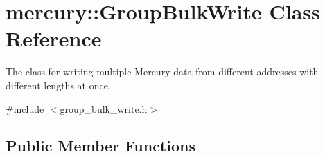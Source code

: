 \hypertarget{classmercury_1_1_group_bulk_write}{}\section{mercury\+:\+:Group\+Bulk\+Write Class Reference}
\label{classmercury_1_1_group_bulk_write}


The class for writing multiple Mercury data from different addresses with different lengths at once.  




{\ttfamily \#include $<$group\+\_\+bulk\+\_\+write.\+h$>$}

\subsection*{Public Member Functions}
